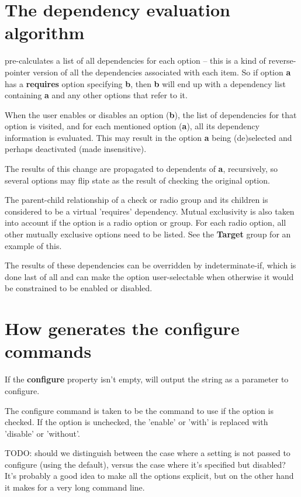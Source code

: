 \section{The dependency evaluation algorithm}

\ctshortname pre-calculates a list of all dependencies
for each option -- this is a kind of reverse-pointer version
of all the dependencies associated with each item. So
if option {\bf a} has a {\bf requires} option specifying
{\bf b}, then {\bf b} will end up with a dependency list
containing {\bf a} and any other options that refer to it.

When the user enables or disables an option ({\bf b}),
the list of dependencies for that option is visited,
and for each mentioned option ({\bf a}), all its dependency information
is evaluated. This may result in the option {\bf a} being
(de)selected and perhaps deactivated (made insensitive).

The results of this change are propagated to dependents of
{\bf a}, recursively, so several options may flip state
as the result of checking the original option.

The parent-child relationship of a check or radio
group and its children is considered to be a virtual
'requires' dependency. Mutual exclusivity is also
taken into account if the option is a radio option
or group. For each radio option, all other mutually
exclusive options need to be listed. See the
{\bf Target} group for an example of this.

The results of these dependencies can be overridden by
indeterminate-if, which is done last of all and can
make the option user-selectable when otherwise it
would be constrained to be enabled or disabled.

\section{How \ctshortname generates the configure commands}

If the {\bf configure} property isn't empty,
\ctshortname will output the string as a parameter
to configure.

The configure command is taken to be the command to
use if the option is checked. If the option is
unchecked, the 'enable' or 'with' is replaced with
'disable' or 'without'.

TODO: should we distinguish between the case
where a setting is not passed to configure (using
the default), versus the case where it's specified but disabled?
It's probably a good idea to make all the options
explicit, but on the other hand it makes for a very long
command line.

